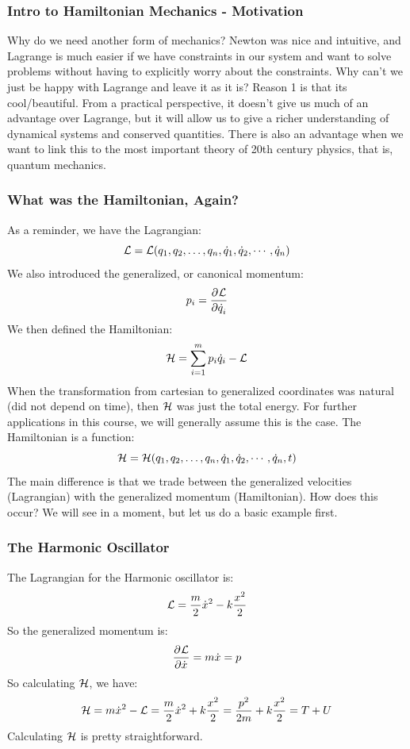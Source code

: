\subsubsection{Intro to Hamiltonian Mechanics - Motivation}
Why do we need another form of mechanics? Newton was nice and intuitive, and Lagrange is much easier if we have constraints in our system and want to solve problems without having to explicitly worry about the constraints. Why can't we just be happy with Lagrange and leave it as it is? Reason 1 is that its cool/beautiful. From a practical perspective, it doesn't give us much of an advantage over Lagrange, but it will allow us to give a richer understanding of dynamical systems and conserved quantities. There is also an advantage when we want to link this to the most important theory of 20th century physics, that is, quantum mechanics. 

\subsubsection{What was the Hamiltonian, Again?}
As a reminder, we have the Lagrangian:
\[\mathcal{L} = \mathcal{L}(q_1, q_2, \ldots, q_n, \dot{q}_1, \dot{q}_2, \cdots, \dot{q}_n)\]
We also introduced the generalized, or canonical momentum:
\[p_i = \dpd{\LL}{\dot{q}_i}\]
We then defined the Hamiltonian:
\[\mathcal{H} = \sum_{i=1}^mp_i\dot{q}_i - \mathcal{L}\]
When the transformation from cartesian to generalized coordinates was natural (did not depend on time), then $\mathcal{H}$ was just the total energy. For further applications in this course, we will generally assume this is the case. The Hamiltonian is a function:
\[\mathcal{H} = \mathcal{H}(q_1, q_2, \ldots, q_n, \dot{q}_1, \dot{q}_2, \cdots, \dot{q}_n, t)\]
The main difference is that we trade between the generalized velocities (Lagrangian) with the generalized momentum (Hamiltonian). How does this occur? We will see in a moment, but let us do a basic example first. 

\subsubsection{The Harmonic Oscillator}
The Lagrangian for the Harmonic oscillator is:
\[\mathcal{L} = \frac{m}{2}\dot{x}^2 - k\frac{x^2}{2}\]
So the generalized momentum is:
\[\dpd{\LL}{\dot{x}} = m\dot{x} = p\]
So calculating $\mathcal{H}$, we have:
\[\mathcal{H} = m\dot{x}^2 - \mathcal{L} = \frac{m}{2}\dot{x}^2 + k\frac{x^2}{2} = \frac{p^2}{2m} + k\frac{x^2}{2} =  T + U\]
Calculating $\mathcal{H}$ is pretty straightforward.


